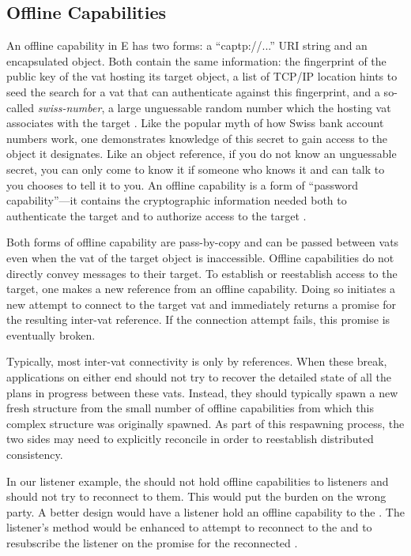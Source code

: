 \documentclass{llncs}
\begin{document}
\subsection{Offline Capabilities}

An offline capability in E has two forms: a ``captp://...'' URI string
and an encapsulated  object. Both contain the same
information: the fingerprint of the public key of the vat hosting its
target object, a list of TCP/IP location hints to seed the search for
a vat that can authenticate against this fingerprint, and a so-called
\emph{swiss-number}, a large unguessable random number which the
hosting vat associates with the target \cite{tyler:yurl}. Like the
popular myth of how Swiss bank account numbers work, one demonstrates
knowledge of this secret to gain access to the object it designates.
Like an object reference, if you do not know an unguessable secret,
you can only come to know it if someone who knows it and can talk to
you chooses to tell it to you. An offline capability is a form of
``password capability''---it contains the cryptographic information
needed both to authenticate the target and to authorize access to the
target \cite{jed:dccs}.

Both forms of offline capability are pass-by-copy and can be passed
between vats even when the vat of the target object is inaccessible. Offline
capabilities do not directly convey messages to their target. To
establish or reestablish access to the target, one makes a new
reference from an offline capability. Doing so initiates a new attempt
to connect to the target vat and immediately returns a promise for
the resulting inter-vat reference. If the connection attempt fails,
this promise is eventually broken.

Typically, most inter-vat connectivity is only by references. When
these break, applications on either end should not try to recover the
detailed state of all the plans in progress between these
vats. Instead, they should typically spawn a new fresh structure from
the small number of offline capabilities from which this complex
structure was originally spawned. As part of this respawning process,
the two sides may need to explicitly reconcile in order to reestablish
distributed consistency.

In our listener example, the  should not hold
offline capabilities to listeners and should not try to reconnect to
them. This would put the burden on the wrong party. A better design
would have a listener hold an offline capability to the
. The listener's 
method would be enhanced to attempt to reconnect to the
 and to resubscribe the listener on the promise for
the reconnected .
\end{document}
